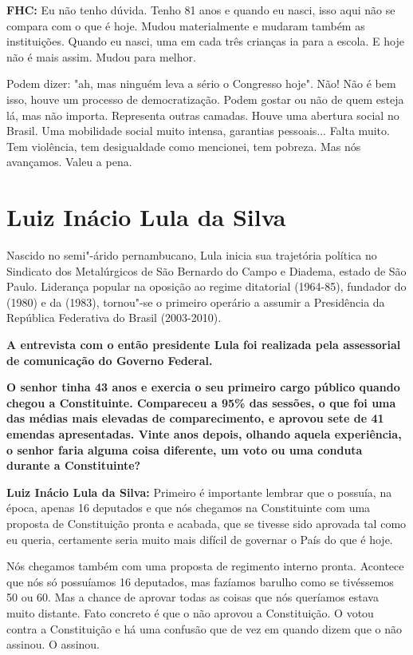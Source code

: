 \textbf{FHC:} Eu não tenho dúvida. Tenho 81 anos e quando eu nasci, isso
aqui não se compara com o que é hoje. Mudou materialmente e mudaram
também as instituições. Quando eu nasci, uma em cada três crianças ia
para a escola. E hoje não é mais assim. Mudou para melhor.

Podem dizer: "ah, mas ninguém leva a sério o Congresso hoje". Não! Não é
bem isso, houve um processo de democratização. Podem gostar ou não de
quem esteja lá, mas não importa. Representa outras camadas. Houve uma
abertura social no Brasil. Uma mobilidade social muito intensa,
garantias pessoais... Falta muito. Tem violência, tem desigualdade como
mencionei, tem pobreza. Mas nós avançamos. Valeu a pena.

\chapter{Luiz Inácio Lula da Silva}

Nascido no semi"-árido pernambucano, Lula inicia sua trajetória política
no Sindicato dos Metalúrgicos de São Bernardo do Campo e Diadema, estado
de São Paulo. Liderança popular na oposição ao regime ditatorial
(1964-85), fundador do  (1980) e da  (1983), tornou"-se o primeiro
operário a assumir a Presidência da República Federativa do Brasil
(2003-2010).

\textbf{A entrevista com o então presidente Lula foi realizada pela
assessorial de comunicação do Governo Federal.}

\textbf{O senhor tinha 43 anos e exercia o seu primeiro cargo público
quando chegou a Constituinte. Compareceu a 95\% das sessões, o que foi
uma das médias mais elevadas de comparecimento, e aprovou sete de 41
emendas apresentadas. Vinte anos depois, olhando aquela experiência, o
senhor faria alguma coisa diferente, um voto ou uma conduta durante a
Constituinte?}

\textbf{Luiz Inácio Lula da Silva:} Primeiro é importante lembrar que o
 possuía, na época, apenas 16 deputados e que nós chegamos na
Constituinte com uma proposta de Constituição pronta e acabada, que se
tivesse sido aprovada tal como eu queria, certamente seria muito mais
difícil de governar o País do que é hoje.

Nós chegamos também com uma proposta de regimento interno pronta.
Acontece que nós só possuíamos 16 deputados, mas fazíamos barulho como
se tivéssemos 50 ou 60. Mas a chance de aprovar todas as coisas que nós
queríamos estava muito distante. Fato concreto é que o  não aprovou a
Constituição. O  votou contra a Constituição e há uma confusão que de
vez em quando dizem que o  não assinou. O  assinou.

